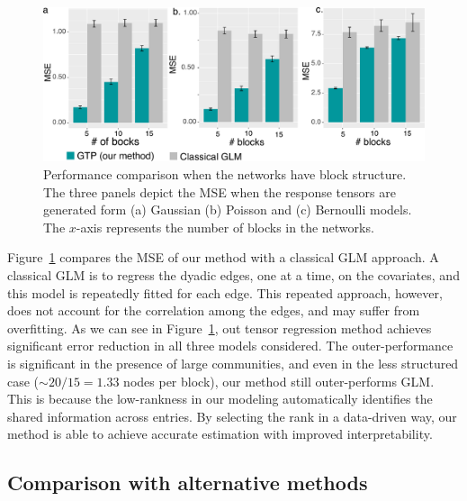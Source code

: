 \documentclass[12pt]{article}
\theoremstyle{plain}
\theoremstyle{definition}
\begin{document}
\begin{figure}[tb]
\centering
\includegraphics[width=15cm]{comparison.pdf}
\caption{Performance comparison when the networks have block structure. The three panels depict the MSE when the response tensors are generated form (a) Gaussian (b) Poisson and (c) Bernoulli models. The $x$-axis represents the number of blocks in the networks. }\label{fig:glm}
\end{figure}


Figure~\ref{fig:glm} compares the MSE of our method with a classical GLM approach. A classical GLM is to regress the dyadic edges, one at a time, on the covariates, and this model is repeatedly fitted for each edge. This repeated approach, however, does not account for the correlation among the edges, and may suffer from overfitting. As we can see in Figure~\ref{fig:glm}, out tensor regression method achieves significant error reduction in all three models considered. The outer-performance is significant in the presence of large communities, and even in the less structured case ($\sim 20/15=1.33$ nodes per block), our method still outer-performs GLM. This is because the low-rankness in our modeling automatically identifies the shared information across entries. By selecting the rank in a data-driven way, our method is able to achieve accurate estimation with improved interpretability. 

\subsection{Comparison with alternative methods}
\end{document}
